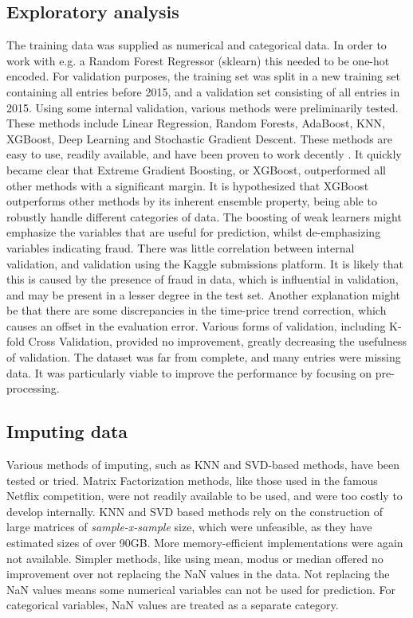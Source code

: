 \documentclass[a4paper,11pt,twocolumn]{article}
\begin{document}
\subsection{Exploratory analysis}
The training data was supplied as numerical and categorical data. In order to
work with e.g. a Random Forest Regressor (sklearn) this needed to be one-hot
encoded. For validation purposes, the training set was split in a new training
set containing all entries before 2015, and a validation set consisting of all
entries in 2015. Using some internal validation, various methods were
preliminarily tested. These methods include Linear Regression, Random Forests,
AdaBoost, KNN, XGBoost, Deep Learning and Stochastic Gradient Descent. These
methods are easy to use, readily available, and have been proven to work
decently . It quickly became clear that Extreme Gradient Boosting, or XGBoost,
outperformed all other methods with a significant margin. It is hypothesized
that XGBoost outperforms other methods by its inherent ensemble property, being
able to robustly handle different categories of data. The boosting of weak
learners might emphasize the variables that are useful for prediction, whilst
de-emphasizing variables indicating fraud.  There was little correlation between
internal validation, and validation using the Kaggle submissions platform. It is
likely that this is caused by the presence of fraud in data, which is
influential in validation, and may be present in a lesser degree in the test
set. Another explanation might be that there are some discrepancies in the
time-price trend correction, which causes an offset in the evaluation error.
Various forms of validation, including K-fold Cross Validation, provided no
improvement, greatly decreasing the usefulness of validation. The dataset was
far from complete, and many entries were missing data. It was particularly
viable to improve the performance by focusing on pre-processing.


\subsection{Imputing data}
Various methods of imputing, such as KNN and SVD-based methods, have been tested
or tried. Matrix Factorization methods, like those used in the famous Netflix
competition, were not readily available to be used, and were too costly to
develop internally. KNN and SVD based methods rely on the construction of large
matrices of \emph{sample-x-sample} size, which were unfeasible, as they have
estimated sizes of over 90GB. More memory-efficient implementations were again
not available. Simpler methods, like using mean, modus or median offered no
improvement over not replacing the NaN values in the data. Not replacing the NaN
values means some numerical variables can not be used for prediction. For
categorical variables, NaN values are treated as a separate category.
\end{document}
